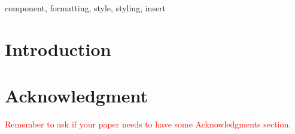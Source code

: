 \documentclass[conference]{IEEEtran}
\begin{document}
\begin{IEEEkeywords}
component, formatting, style, styling, insert
\end{IEEEkeywords}

\section{Introduction}



\section*{Acknowledgment}

\textcolor{red}{Remember to ask if your paper needs to have some Acknowledgments section.}

\balance
% 


\end{document}
